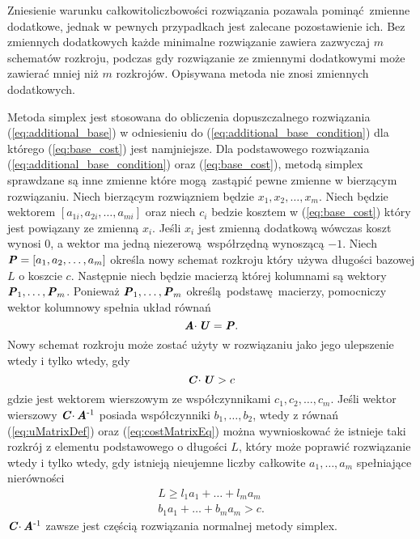 Zniesienie warunku całkowitoliczbowości rozwiązania pozawala pominąć zmienne dodatkowe, jednak w pewnych przypadkach jest zalecane pozostawienie ich. Bez zmiennych dodatkowych każde minimalne rozwiązanie zawiera zazwyczaj $m$ schematów rozkroju, podczas gdy rozwiązanie ze zmiennymi dodatkowymi może zawierać mniej niż $m$ rozkrojów. Opisywana metoda nie znosi zmiennych dodatkowych.

Metoda simplex jest stosowana do obliczenia dopuszczalnego rozwiązania (\ref{eq:additional_base}) w odniesieniu do (\ref{eq:additional_base_condition}) dla którego (\ref{eq:base_cost}) jest namjniejsze. Dla podstawowego rozwiązania (\ref{eq:additional_base_condition}) oraz (\ref{eq:base_cost}), metodą simplex sprawdzane są inne zmienne które mogą zastąpić pewne zmienne w bierzącym rozwiązaniu. Niech bierzącym rozwiązniem będzie $x_1,x_2,\dots,x_m$. Niech  będzie wektorem $[a_{1i}, a_{2i}, \dots, a_{mi}]$ oraz niech $c_i$ bedzie kosztem w (\ref{eq:base_cost}) który jest powiązany ze zmienną $x_i$. Jeśli $x_i$ jest zmienną dodatkową wówczas koszt wynosi $0$, a wektor ma jedną niezerową współrzędną wynoszącą $-1$. Niech $\textbf{\textit{P}} = [a_1,a_2,\dots,a_m]$ określa nowy schemat rozkroju który używa długości bazowej $L$ o koszcie $c$. Następnie niech  będzie macierzą której kolumnami są wektory $\textbf{\textit{P}}_1,\dots,\textbf{\textit{P}}_m$. Ponieważ $\textbf{\textit{P}}_1, \dots, \textbf{\textit{P}}_m$ określą podstawę macierzy, pomocniczy wektor kolumnowy  spełnia układ równań
\begin{equation}\label{eq:uMatrixDef}
  \textbf{\textit{A}} \cdotp \textbf{\textit{U}} = \textbf{\textit{P}}.
\end{equation}
Nowy schemat rozkroju może zostać użyty w rozwiązaniu jako jego ulepszenie wtedy i tylko wtedy, gdy
\begin{equation}\label{eq:costMatrixEq}
  \textbf{\textit{C}} \cdotp \textbf{\textit{U}} > c
\end{equation}
gdzie  jest wektorem wierszowym ze współczynnikami $c_1,c_2,\dots,c_m$. Jeśli wektor wierszowy $\textbf{\textit{C}} \cdotp \textbf{\textit{A}}\textsuperscript{-1}$ posiada współczynniki $b_1,\dots,b_2$, wtedy z równań (\ref{eq:uMatrixDef}) oraz (\ref{eq:costMatrixEq}) można wywnioskować że istnieje taki rozkrój z elementu podstawowego o długości $L$, który może poprawić rozwiązanie wtedy i tylko wtedy, gdy istnieją nieujemne liczby całkowite $a_1,\dots,a_m$ spełniające nierówności
\begin{align}
L \ge l_1a_1+\dots+l_ma_m \label{length_eq} \\
b_1a_1+\dots+b_ma_m > c. \label{cost_eq}
\end{align}
$\textbf{\textit{C}} \cdotp \textbf{\textit{A}}\textsuperscript{-1}$ zawsze jest częścią rozwiązania normalnej metody simplex.

